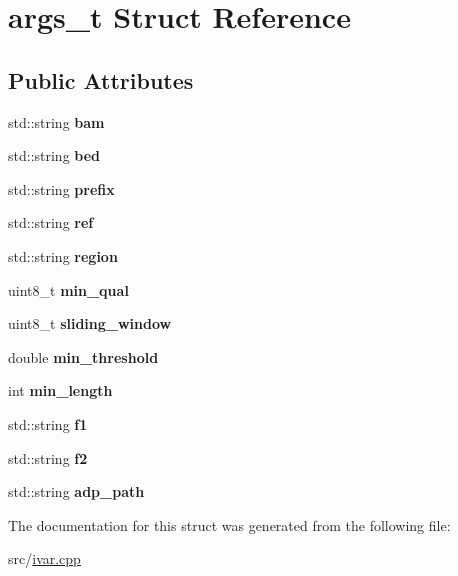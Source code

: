 \hypertarget{structargs__t}{}\section{args\+\_\+t Struct Reference}
\label{structargs__t}
\subsection*{Public Attributes}
\begin{DoxyCompactItemize}
\item 
\mbox{\label{structargs__t_a4a56cd340eee8109492b5b2813bffa68}} 
std\+::string {\bfseries bam}
\item 
\mbox{\label{structargs__t_af0cf1f1dcf2e6bd10b38874e52363ff7}} 
std\+::string {\bfseries bed}
\item 
\mbox{\label{structargs__t_a3df967e3e87023ce97de2db4301b64b6}} 
std\+::string {\bfseries prefix}
\item 
\mbox{\label{structargs__t_a3f2712219c8cafc6d4ebca9a3136febe}} 
std\+::string {\bfseries ref}
\item 
\mbox{\label{structargs__t_a5dc4e74b7f851e7eccb357a8753dd67b}} 
std\+::string {\bfseries region}
\item 
\mbox{\label{structargs__t_acda0278084584a82d4b593c2fc5a7dd1}} 
uint8\+\_\+t {\bfseries min\+\_\+qual}
\item 
\mbox{\label{structargs__t_a34784c067b84338504bd616a8796e82c}} 
uint8\+\_\+t {\bfseries sliding\+\_\+window}
\item 
\mbox{\label{structargs__t_a2ba7423a36d54197ddae057ee93e28c9}} 
double {\bfseries min\+\_\+threshold}
\item 
\mbox{\label{structargs__t_a0ff7dd94de09d68a202076142c8b0b05}} 
int {\bfseries min\+\_\+length}
\item 
\mbox{\label{structargs__t_a8faaa14c7ba16976ecbd04d3879bbfe7}} 
std\+::string {\bfseries f1}
\item 
\mbox{\label{structargs__t_ad47eebe1750174da6bba676d31d0c79e}} 
std\+::string {\bfseries f2}
\item 
\mbox{\label{structargs__t_a8eef0ae6cd79d1d62f77fb8398d1e7a3}} 
std\+::string {\bfseries adp\+\_\+path}
\end{DoxyCompactItemize}


The documentation for this struct was generated from the following file\+:\begin{DoxyCompactItemize}
\item 
src/\mbox{\hyperlink{ivar_8cpp}{ivar.\+cpp}}\end{DoxyCompactItemize}
